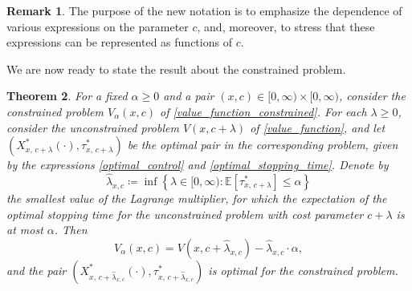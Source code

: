 \documentclass[11pt,tbtags,reqno]{article}
\newtheorem{Th}{Theorem}[section]
\theoremstyle{definition}
\newtheorem{remark}[Th]{Remark}
\numberwithin{equation}{section}
\theoremstyle{definition}
\newcommand{\ex}{\mathbb{E}}
\begin{document}
\begin{remark}
    The purpose of the new notation is to emphasize the dependence of various expressions on the parameter $c$, and, moreover, to stress that these expressions can be represented as functions of $c$.
\end{remark}

We are now ready to state the result about the constrained problem.

\begin{Th}
    For a fixed $\alpha \ge 0$ and a pair $(x, c) \in [0, \infty) \times [0, \infty)$, consider the constrained problem $V_\alpha(x, c)$ of \eqref{value_function_constrained}. 
    For each $\lambda \ge 0$, consider the unconstrained problem $V(x, c + \lambda)$ of \eqref{value_function}, and let 
    $\left(X^*_{x, \, c + \lambda}(\cdot), \tau^*_{x, \, c + \lambda}\right)$ 
    be the optimal pair in the corresponding problem, given by the expressions \eqref{optimal_control} and \eqref{optimal_stopping_time}. 
    Denote by 
    \begin{equation}\label{lagrange_multiplier}
        \widehat{\lambda}_{x, c} \coloneqq \inf \left\{\lambda \in [0, \infty): \ex\left[\tau^*_{x, \, c + \lambda}\right] \le \alpha \right\}
    \end{equation}
    the smallest value of the Lagrange multiplier, for which the expectation of the optimal stopping time for the unconstrained problem with cost parameter $c + 
    \lambda$ is at most $\alpha$. 
    Then 
    \begin{equation}
        V_\alpha(x, c) = V\left(x, c + \widehat{\lambda}_{x, c}\right) - \widehat{\lambda}_{x, c} \cdot \alpha,
    \end{equation}
    and the pair $\left(X^*_{x, \, c + \widehat{\lambda}_{x, c}}(\cdot), \tau^*_{x, \, c + \widehat{\lambda}_{x, c}}\right)$ is optimal for the constrained problem.
\end{Th}

\end{document}

